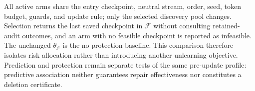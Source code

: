 All active arms share the entry checkpoint, neutral stream, order, seed,
token budget, guards, and update rule; only the selected discovery pool
changes. Selection returns the last saved checkpoint in $\mathcal F$ without
consulting retained-audit outcomes, and an arm with no feasible checkpoint is
reported as infeasible. The unchanged $\theta_{t^\dagger}$ is the
no-protection baseline. This comparison therefore isolates risk allocation
rather than introducing another unlearning objective. Prediction and
protection remain separate tests of the same pre-update profile: predictive
association neither guarantees repair effectiveness nor constitutes a
deletion certificate.
